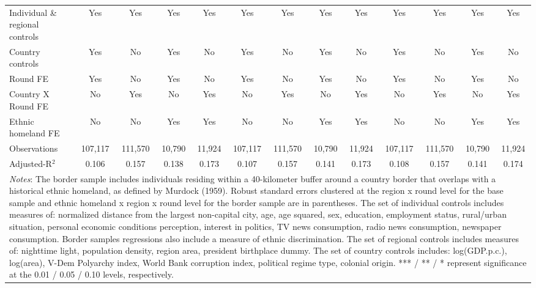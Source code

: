 \documentclass[11pt]{article}
\theoremstyle{plain}
\theoremstyle{plain}
\begin{document}
\begin{table}[H]
{\begin{tabular}{@{\extracolsep{5pt}} l c c c c c c c c c c c c}
    \midrule
         \smallskip
        Individual \& regional controls  & Yes & Yes & Yes & Yes  & Yes & Yes & Yes & Yes & Yes & Yes & Yes & Yes \\
        \smallskip
        Country controls & Yes& No& Yes& No& Yes& No& Yes& No& Yes& No& Yes& No\\
        \smallskip
        Round FE & Yes & No& Yes & No & Yes & No& Yes & No & Yes & No& Yes & No\\
        \smallskip
        Country X Round FE       & No & Yes& No & Yes& No & Yes& No & Yes& No & Yes& No & Yes\\
        \smallskip
        Ethnic homeland FE & No & No & Yes& Yes& No & No & Yes& Yes& No & No & Yes& Yes\\
        \smallskip
        Observations            &      107,117   &      111,570   &       10,790   &       11,924   & 107,117   &      111,570   &       10,790   &       11,924   &      107,117   &      111,570   &       10,790   &       11,924 \\
        Adjusted-R$^2$         &    0.106   &       0.157   &       0.138   &       0.173 & 0.107   &       0.157   &       0.141   &       0.173 &       0.108   &       0.157   &       0.141   &       0.174\\
                              \bottomrule
        \multicolumn{13}{p{29cm}}{\footnotesize \emph{Notes}: The border sample includes individuals residing within a 40-kilometer buffer around a country border that overlaps with a historical ethnic homeland, as defined by Murdock (1959). Robust standard errors clustered at the region x round level  for the base sample and ethnic homeland x region x round level for the border sample are in parentheses. The set of individual controls
        includes measures of: normalized distance from the largest non-capital city, age, age squared, sex,
        education, employment status, rural/urban situation, personal economic conditions perception, interest in politics, TV news consumption, radio news consumption, newspaper consumption. Border samples regressions also include a measure of ethnic discrimination. The set of regional controls includes measures of: nighttime light, population density, region area, president birthplace dummy. The set of country controls includes: log(GDP.p.c.), log(area), V-Dem Polyarchy index, World Bank corruption index, political regime type, colonial origin. *** / ** / * represent significance at the 0.01 / 0.05 / 0.10 levels, respectively.}
        \end{tabular}
        }
        \end{table}
\end{document}
